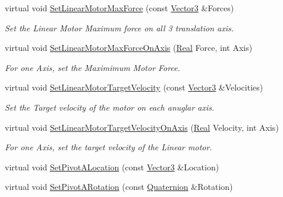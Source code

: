 \begin{DoxyCompactItemize}
virtual void \hyperlink{classMezzanine_1_1Generic6DofConstraint_a9338ccdac5c4eaf9b561feb242c5f89e}{SetLinearMotorMaxForce} (const \hyperlink{classMezzanine_1_1Vector3}{Vector3} \&Forces)
\begin{DoxyCompactList}\small\item\em Set the Linear Motor Maximum force on all 3 translation axis. \item\end{DoxyCompactList}\item 
virtual void \hyperlink{classMezzanine_1_1Generic6DofConstraint_ab8286b0bb20cccc7c2810ad76c9d3ee5}{SetLinearMotorMaxForceOnAxis} (\hyperlink{namespaceMezzanine_a726731b1a7df72bf3583e4a97282c6f6}{Real} Force, int Axis)
\begin{DoxyCompactList}\small\item\em For one Axis, set the Maximimum Motor Force. \item\end{DoxyCompactList}\item 
virtual void \hyperlink{classMezzanine_1_1Generic6DofConstraint_a5458f6dc3b7b321a7323dcf4103737e8}{SetLinearMotorTargetVelocity} (const \hyperlink{classMezzanine_1_1Vector3}{Vector3} \&Velocities)
\begin{DoxyCompactList}\small\item\em Set the Target velocity of the motor on each anuglar axis. \item\end{DoxyCompactList}\item 
virtual void \hyperlink{classMezzanine_1_1Generic6DofConstraint_abc6bc013544b9793c17a929578115b32}{SetLinearMotorTargetVelocityOnAxis} (\hyperlink{namespaceMezzanine_a726731b1a7df72bf3583e4a97282c6f6}{Real} Velocity, int Axis)
\begin{DoxyCompactList}\small\item\em For one Axis, set the target velocity of the Linear motor. \item\end{DoxyCompactList}\item 
virtual void \hyperlink{classMezzanine_1_1Generic6DofConstraint_a4670a488bc5cab478c6d69c8a0d240a5}{SetPivotALocation} (const \hyperlink{classMezzanine_1_1Vector3}{Vector3} \&Location)
\item 
virtual void \hyperlink{classMezzanine_1_1Generic6DofConstraint_a34027d82e3b8c09c6cd488335ea343bb}{SetPivotARotation} (const \hyperlink{classMezzanine_1_1Quaternion}{Quaternion} \&Rotation)
\item 

\end{DoxyCompactItemize}
